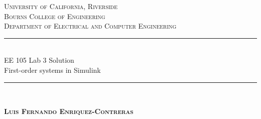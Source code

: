 \documentclass[12pt]{article}
\begin{document}
	\begin{titlepage}
		
		\newcommand{\HRule}{\rule{\linewidth}{0.5mm}} %
		
		\center %
		
		
		\textsc{\LARGE University of California, Riverside}\\[1.5cm] %
		\textsc{\Large Bourns College of Engineering}\\[0.5cm] %
		\textsc{\large Department of Electrical and Computer Engineering}\\[0.5cm] %
		
		
		\HRule \\[0.6cm]
		{\Large EE 105 Lab 3 Solution \\ \normalsize First-order systems in Simulink}\\[0.4cm] %
		\HRule \\[1.0cm]
		
		
		\begin{center} \large
			\medskip
			{\textsc{\textbf{Luis Fernando Enriquez-Contreras} }} 
		\end{center}
		
		
		\begin{center}
			{\large }
		\end{center}
		

\end{titlepage}
\end{document}
